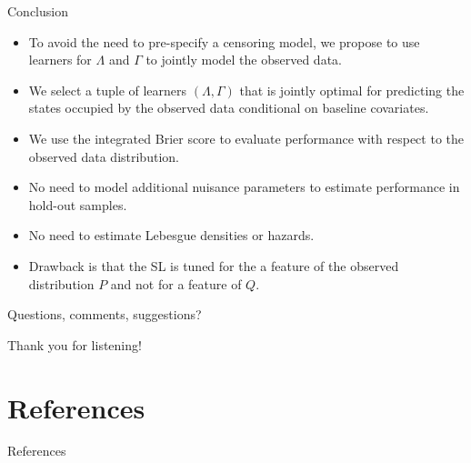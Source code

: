 \documentclass[smaller]{beamer}\usepackage{listings}
\begin{document}
\begin{frame}[label={sec:org2a83a90}]{Conclusion}
\small

\begin{itemize}
\item To avoid the need to pre-specify a censoring model, we propose to use learners
for \(\Lambda\) and \(\Gamma\) to jointly model the observed data.
\item We select a tuple of learners \((\Lambda, \Gamma)\) that is jointly optimal
for predicting the states occupied by the observed data conditional on
baseline covariates.
\item We use the integrated Brier score to evaluate performance with
respect to the observed data distribution.
\item No need to model additional nuisance parameters to estimate performance in
hold-out samples.
\item No need to estimate Lebesgue densities or hazards.
\item Drawback is that the SL is tuned for the a feature of the observed
distribution \(P\) and not for a feature of \(Q\).
\end{itemize}

\vfill


\begin{block}{Questions, comments, suggestions?}
\vfill

\flushright Thank you for listening!
\end{block}
\end{frame}

\section*{References}
\label{sec:org1cf7bec}
\begin{frame}[label={sec:org8067f91}]{References}
\tiny 
\end{frame}
\end{document}
